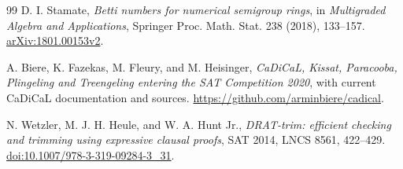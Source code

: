 \documentclass[11pt]{article}
\theoremstyle{definition}
\theoremstyle{remark}
\begin{document}
{\begin{thebibliography}{99}
D. I. Stamate,
\emph{Betti numbers for numerical semigroup rings},
in \emph{Multigraded Algebra and Applications}, Springer Proc. Math. Stat. 238 (2018), 133--157.
\href{https://arxiv.org/abs/1801.00153}{arXiv:1801.00153v2}.

A. Biere, K. Fazekas, M. Fleury, and M. Heisinger,
\emph{CaDiCaL, Kissat, Paracooba, Plingeling and Treengeling entering the SAT Competition 2020},
with current CaDiCaL documentation and sources.
\url{https://github.com/arminbiere/cadical}.

N. Wetzler, M. J. H. Heule, and W. A. Hunt Jr.,
\emph{DRAT-trim: efficient checking and trimming using expressive clausal proofs},
SAT 2014, LNCS 8561, 422--429.
\href{https://doi.org/10.1007/978-3-319-09284-3_31}{doi:10.1007/978-3-319-09284-3\_31}.

\end{thebibliography}
}
\end{document}

